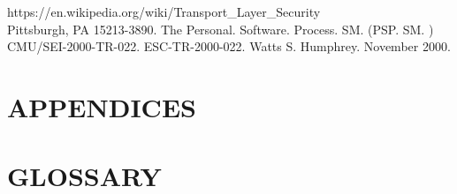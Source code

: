 \documentclass[hidelinks,a4paper,12pt]{article}
\begin{document}
\noindent
[6] https://en.wikipedia.org/wiki/Transport\_Layer\_Security \\

\noindent
[7] Pittsburgh, PA 15213-3890. The Personal. Software. Process. SM. (PSP. SM. ) CMU/SEI-2000-TR-022. ESC-TR-2000-022. Watts S. Humphrey. November 2000.

\newpage

\section{\MakeUppercase{Appendices}}

\renewcommand{\cftfigfont}{Figure }

\listoffigures


\newpage

\renewcommand{\cfttabfont}{Table }

\listoftables

\newpage
\section{\MakeUppercase{Glossary}}

  
\printglossaries

\end{document}
